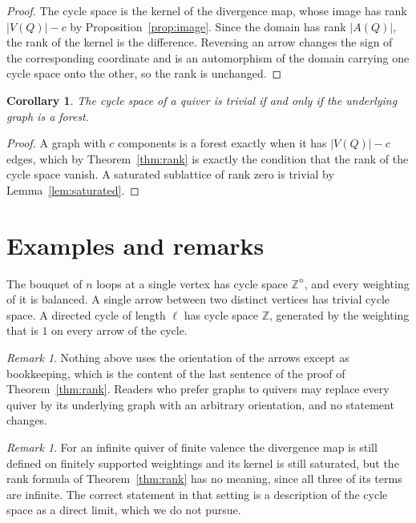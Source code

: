 \documentclass[11pt]{article}
\theoremstyle{plain}
\newtheorem{corollary}[theorem]{Corollary}
\theoremstyle{definition}
\theoremstyle{remark}
\newtheorem{remark}[theorem]{Remark}
\newcommand{\ZZ}{\mathbb{Z}}
\begin{document}
\begin{proof}
The cycle space is the kernel of the divergence map, whose image has rank $|V(Q)| - c$ by Proposition~\ref{prop:image}. Since the domain has rank $|A(Q)|$, the rank of the kernel is the difference. Reversing an arrow changes the sign of the corresponding coordinate and is an automorphism of the domain carrying one cycle space onto the other, so the rank is unchanged.
\end{proof}

\begin{corollary}\label{cor:forest}
The cycle space of a quiver is trivial if and only if the underlying graph is a forest.
\end{corollary}

\begin{proof}
A graph with $c$ components is a forest exactly when it has $|V(Q)| - c$ edges, which by Theorem~\ref{thm:rank} is exactly the condition that the rank of the cycle space vanish. A saturated sublattice of rank zero is trivial by Lemma~\ref{lem:saturated}.
\end{proof}

\section{Examples and remarks}

The bouquet of $n$ loops at a single vertex has cycle space $\ZZ^{n}$, and every weighting of it is balanced. A single arrow between two distinct vertices has trivial cycle space. A directed cycle of length $\ell$ has cycle space $\ZZ$, generated by the weighting that is $1$ on every arrow of the cycle.

\begin{remark}\label{rem:orientation}
Nothing above uses the orientation of the arrows except as bookkeeping, which is the content of the last sentence of the proof of Theorem~\ref{thm:rank}. Readers who prefer graphs to quivers may replace every quiver by its underlying graph with an arbitrary orientation, and no statement changes.
\end{remark}

\begin{remark}\label{rem:infinite}
For an infinite quiver of finite valence the divergence map is still defined on finitely supported weightings and its kernel is still saturated, but the rank formula of Theorem~\ref{thm:rank} has no meaning, since all three of its terms are infinite. The correct statement in that setting is a description of the cycle space as a direct limit, which we do not pursue.
\end{remark}
\end{document}
